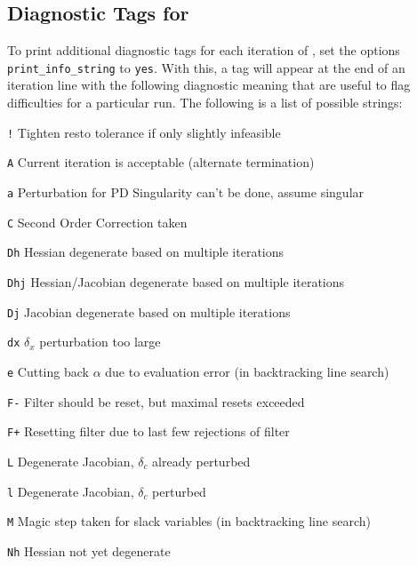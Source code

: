 \subsection{Diagnostic Tags for \IPOPT}

To print additional diagnostic tags for each iteration of \IPOPT, set
the options \texttt{print\_info\_string} to \texttt{yes}. With
this, a tag will appear at the end of an iteration line with the
following diagnostic meaning that are useful to flag difficulties for
a particular \IPOPT run.  The following is a list of possible strings:
\begin{list}{blub}{\itemsep0pt}
 \item[\texttt{!}] Tighten resto tolerance if only slightly infeasible \cite[Sec.~3.3]{WaBi2006}
 \item[\texttt{A}] Current iteration is acceptable (alternate termination)
 \item[\texttt{a}] Perturbation for PD Singularity can't be done, assume singular \cite[Sec.~3.1]{WaBi2006}
 \item[\texttt{C}] Second Order Correction taken \cite[Sec.~2.4]{WaBi2006}
 \item[\texttt{Dh}] Hessian degenerate based on multiple iterations \cite[Sec.~3.1]{WaBi2006}
 \item[\texttt{Dhj}] Hessian/Jacobian degenerate based on multiple iterations \cite[Sec.~3.1]{WaBi2006}
 \item[\texttt{Dj}] Jacobian degenerate based on multiple iterations \cite[Sec.~3.1]{WaBi2006}
 \item[\texttt{dx}] $\delta_x$ perturbation too large \cite[Sec.~3.1]{WaBi2006}
 \item[\texttt{e}] Cutting back $\alpha$ due to evaluation error (in backtracking line search)
 \item[\texttt{F-}] Filter should be reset, but maximal resets exceeded \cite[Sec.~2.3]{WaBi2006}
 \item[\texttt{F+}] Resetting filter due to last few rejections of filter \cite[Sec.~2.3]{WaBi2006}
 \item[\texttt{L}] Degenerate Jacobian, $\delta_c$ already perturbed \cite[Sec.~3.1]{WaBi2006}
 \item[\texttt{l}] Degenerate Jacobian, $\delta_c$ perturbed \cite[Sec.~3.1]{WaBi2006}
 \item[\texttt{M}] Magic step taken for slack variables (in backtracking line search)
 \item[\texttt{Nh}] Hessian not yet degenerate \cite[Sec.~3.1]{WaBi2006}

\end{list}
